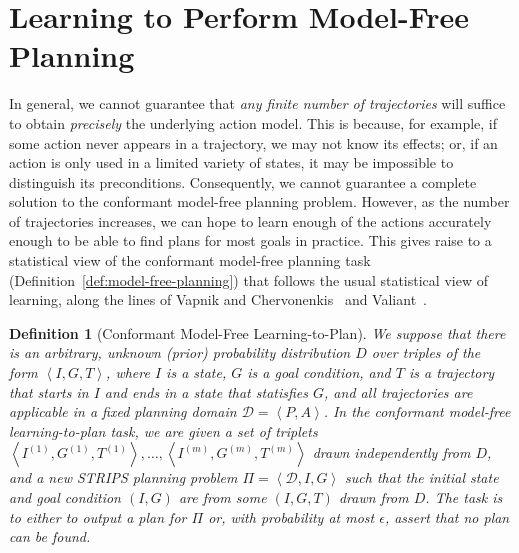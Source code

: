 \documentclass[letterpaper]{article}
\newtheorem{definition}{Definition}
\newcommand{\tuple}[1]{\ensuremath{\left \langle #1 \right \rangle }}
\begin{document}
\section{Learning to Perform Model-Free Planning}
In general, we cannot guarantee that {\em any finite number of trajectories} will suffice to obtain {\em precisely} the underlying action model. This is because, for example, if some action never appears in a trajectory, we may not know its effects; or, if an action is only used in a limited variety of states, it may be impossible to distinguish its preconditions. Consequently, we cannot guarantee a complete solution to the conformant model-free planning problem. However, as the number of trajectories increases, we can hope to learn enough of the actions accurately enough to be able to find plans for most goals in practice. This gives raise to a statistical view of the conformant model-free planning task (Definition~\ref{def:model-free-planning}) that follows the usual statistical view of learning, along the lines of Vapnik and Chervonenkis~ and Valiant~.  %

\begin{definition}[Conformant Model-Free Learning-to-Plan] We suppose that there is an arbitrary, unknown (prior) probability distribution $D$ over triples of the form $\tuple{I,G,T}$, where $I$ is a state, $G$ is a goal condition, and $T$ is a trajectory that starts in $I$ and ends in a state that statisfies $G$, 
and all trajectories are applicable in a fixed planning domain $\mathcal{D}=\tuple{P,A}$. 
In the conformant model-free learning-to-plan task, we are given a set of triplets $\tuple{I^{(1)},G^{(1)},T^{(1)}},\ldots,\tuple{I^{(m)},G^{(m)},T^{(m)}}$ drawn independently from $D$, 
and a new STRIPS planning problem $\Pi=\tuple{\mathcal{D}, I, G}$  
such that the initial state and goal condition $(I,G)$ are from some $(I,G,T)$ drawn from $D$. 
The task is to either to output a plan for $\Pi$ or, with probability at most $\epsilon$, assert that no plan can be found.
\end{definition}
\end{document}
